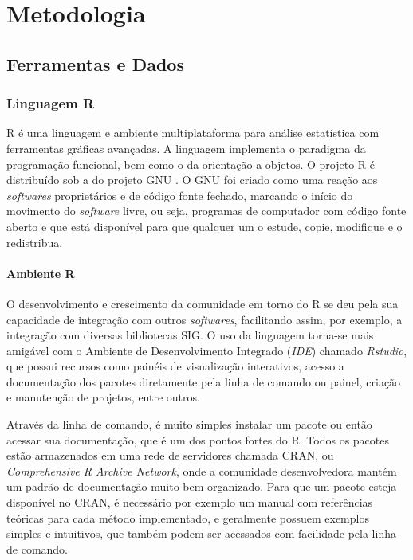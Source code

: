 \chapter{Metodologia}\label{metodologia}

\section{Ferramentas e Dados}\label{ferramentas-e-dados}

\subsection{Linguagem R}\label{linguagem-r}

R é uma linguagem e ambiente multiplataforma para análise estatística
com ferramentas gráficas avançadas. A linguagem implementa o paradigma
da programação funcional, bem como o da orientação a objetos. O projeto
R é distribuído sob a  do projeto GNU \cite{rlang}. O GNU foi criado como uma reação aos \emph{softwares} proprietários
e de código fonte fechado, marcando o início do movimento do
\emph{software} livre, ou seja, programas de computador com código fonte
aberto e que está disponível para que qualquer um o estude, copie,
modifique e o redistribua.\cite{torres2013tecnoutopia}

\subsubsection{Ambiente R}\label{ambiente-r}

O desenvolvimento e crescimento da comunidade em torno do R se deu
pela sua capacidade de integração com outros \emph{softwares},
facilitando assim, por exemplo, a integração com diversas bibliotecas
SIG. O uso da linguagem torna-se mais amigável com o Ambiente de
Desenvolvimento Integrado (\emph{IDE}) chamado \emph{Rstudio}, que
possui recursos como painéis de visualização interativos, acesso a
documentação dos pacotes diretamente pela linha de comando ou painel,
criação e manutenção de projetos, entre outros. \cite{geocompr}

Através da linha de comando, é muito simples instalar um pacote ou
então acessar sua documentação, que é um dos pontos fortes do R. Todos
os pacotes estão armazenados em uma rede de servidores chamada CRAN, ou
\emph{Comprehensive R Archive Network}, onde a comunidade desenvolvedora
mantém um padrão de documentação muito bem organizado. Para que um
pacote esteja disponível no CRAN, é necessário por exemplo um manual com
referências teóricas para cada método implementado, e geralmente possuem
exemplos simples e intuitivos, que também podem ser acessados com
facilidade pela linha de comando.

